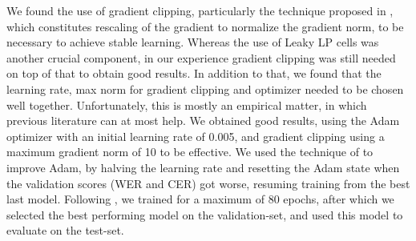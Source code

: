 \documentclass[conference]{IEEEtran}
\begin{document}
We found the use of gradient clipping, particularly the technique proposed in \cite{pmlr-v28-pascanu13}, 
which constitutes rescaling of the gradient to normalize the gradient norm, to be necessary to achieve 
stable learning. Whereas the use of Leaky LP cells was another crucial component, in our experience 
gradient clipping was still needed on top of that to obtain good results. In addition to that, we found 
that the learning rate, max norm for gradient clipping and optimizer needed to be chosen well together.
Unfortunately, this is mostly an empirical matter, in which previous literature can at most help.
We obtained good results, using the Adam optimizer \cite{KingmaEtAl2014} with an initial learning rate of 0.005, and gradient 
clipping using a maximum gradient norm of 10 to be effective. We used the technique of \cite{Denowski2017} to improve Adam, 
by halving the learning rate and resetting the Adam state when the validation scores (WER and CER) got worse, resuming 
training from the best last model. 
Following \cite{Voigtlaender2016}, we trained for a maximum of 80 epochs, 
after which we selected the best performing model on the validation-set, and used this model 
to evaluate on the test-set.
\end{document}
